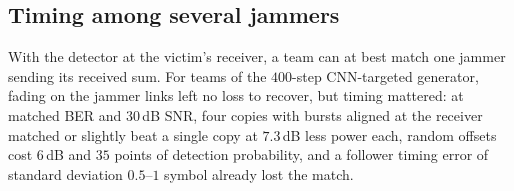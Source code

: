 \subsection{Timing among several jammers}
With the detector at the victim's receiver, a team can at best match one jammer sending its received sum.
For teams of the $400$-step CNN-targeted generator, fading on the jammer links left no loss to recover, but timing mattered: at matched BER and $30$\,dB SNR, four copies with bursts aligned at the receiver matched or slightly beat a single copy at $7.3$\,dB less power each, random offsets cost $6$\,dB and $35$ points of detection probability, and a follower timing error of standard deviation $0.5$--$1$ symbol already lost the match.
